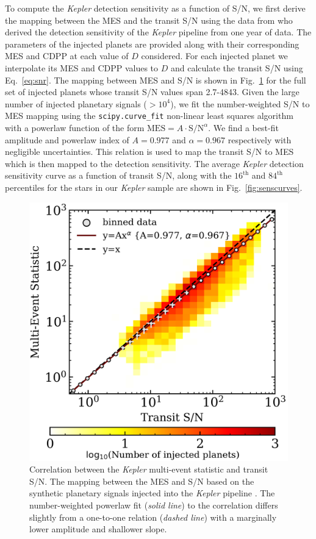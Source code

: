 \documentclass[twocolumn]{emulateapj}
\newcommand{\kepler}[1]{\emph{Kepler}#1}
\begin{document}
To compute the \kepler{} detection sensitivity as a function of S/N, we first
derive the mapping between the MES and the transit S/N using the data from \cite{christiansen15} who
derived the detection sensitivity of the \kepler{} pipeline from one year of data. 
The parameters of the injected planets are provided along with their corresponding MES and CDPP at each value of
$D$ considered. For each injected planet we interpolate its MES and CDPP values to $D$ and calculate
the transit S/N using Eq.~\ref{eq:snr}. The mapping between MES and S/N is shown in Fig.~\ref{fig:messnr}
for the full set of injected planets whose transit S/N values span 2.7-4843. Given the large number of injected planetary
signals ($>10^4$), we fit the number-weighted S/N to MES mapping using the \texttt{scipy.curve\_fit} non-linear least
squares algorithm with a powerlaw function of the form $\text{MES} = A\cdot \text{S/N}^{\alpha}$. We find a best-fit
amplitude and powerlaw index of $A=0.977$ and $\alpha=0.967$ respectively with negligible uncertainties.
This relation is used to map the transit S/N to MES
which is then mapped to the detection sensitivity. The average \kepler{} detection sensitivity curve as a function of
transit S/N, along with the $16^{\text{th}}$ and $84^{\text{th}}$ percentiles for the stars in our \kepler{} sample
are shown in Fig.~\ref{fig:senscurves}.


\begin{figure}
  \centering
  \includegraphics[width=0.98\hsize]{figures/MES_SNR.png}
  \caption{Correlation between the \kepler{} multi-event statistic and transit S/N. The mapping between the MES and
    S/N based on the synthetic planetary signals injected into the \kepler{} pipeline \citep{christiansen15}.
    The number-weighted powerlaw fit (\emph{solid line}) to the correlation differs slightly from a one-to-one relation
    (\emph{dashed line}) with a marginally lower amplitude and shallower slope.}  
  \label{fig:messnr}
\end{figure}
\end{document}
